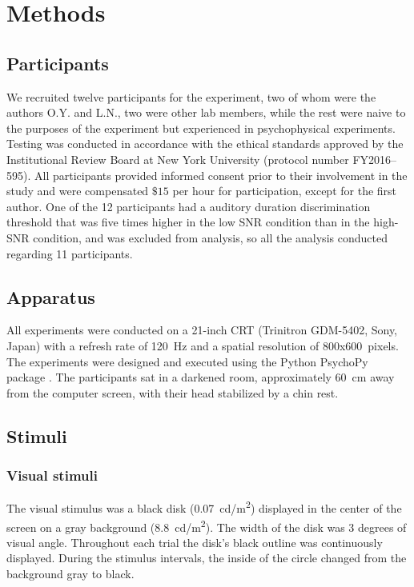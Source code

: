 \documentclass{jov}
\providecommand{\citep}[1]{\cite{#1}}
\begin{document}
\section{Methods}

\subsection{Participants}
We recruited twelve participants for the experiment, two of whom were the authors O.Y. and L.N., two were other lab members, while the rest were naive to the purposes of the experiment but experienced in psychophysical experiments. 
Testing was conducted in accordance with the ethical standards approved by the Institutional Review Board at New York University (protocol number FY2016--595). 
All participants provided informed consent prior to their involvement in the study and were compensated $\$15$ per hour for participation, except for the first author.
One of the 12 participants had a auditory duration discrimination threshold that was five times higher in the low SNR condition than in the high-SNR condition, and was excluded from analysis, so all the analysis conducted regarding 11 participants.


\subsection{Apparatus}

All experiments were conducted on a 21-inch CRT (Trinitron GDM-5402, Sony, Japan) with a refresh rate of 120~Hz and a spatial resolution of 800x600~pixels. The experiments were designed and executed using the Python PsychoPy package \citep{peirce2007psychopy}. The participants sat in a darkened room, approximately 60~cm away from the computer screen, with their head stabilized by a chin rest.

\subsection{Stimuli}

\subsubsection{Visual stimuli}

The visual stimulus was a black disk (0.07~cd/m\textsuperscript{2}) displayed in the center of the screen on a gray background (8.8~cd/m\textsuperscript{2}). The width of the disk was 3 degrees of visual angle. Throughout each trial the disk's black outline was continuously displayed. During the stimulus intervals, the inside of the circle changed from the background gray to black.
\end{document}
